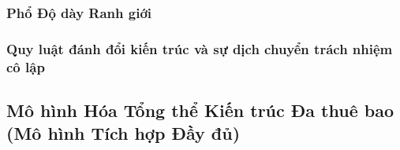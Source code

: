 \par{}
\subsubsection{Phổ Độ dày Ranh giới}
\label{outline:1:reference-model:24}

\par{}
\subsubsection{Quy luật đánh đổi kiến trúc và sự dịch chuyển trách nhiệm cô lập}
\label{outline:1:reference-model:25}

\par{}
\subsection{Mô hình Hóa Tổng thể Kiến trúc Đa thuê bao (Mô hình Tích hợp Đầy đủ)}
\label{outline:1:reference-model:26}
